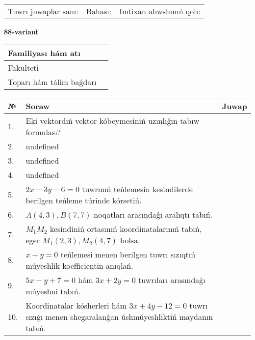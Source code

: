 \documentclass{article}
\begin{document}
\vspace{0.7cm}

\begin{tabular}{lll}
Tuwrı juwaplar sanı: \underline{\hspace{1cm}} & 
Bahası: \underline{\hspace{1cm}} & 
Imtixan alıwshınıń qolı: \underline{\hspace{2cm}} \\
\end{tabular}

\egroup

\newpage


\textbf{88-variant}\\

\bgroup
\def\arraystretch{1.6} %

\begin{tabular}{|m{5.7cm}|m{9.5cm}|}
\hline
Familiyası hám atı & \\
\hline
Fakulteti  & \\
\hline
Toparı hám tálim baǵdarı  & \\
\hline
\end{tabular}

\vspace{0.7cm}

\begin{tabular}{|m{0.7cm}|m{10cm}|m{4cm}|}
\hline
№ & Soraw & Juwap \\
\hline
1. & Eki vektordıń vektor kóbeymesiniń uzınlıǵın tabıw formulası? &  \\
\hline
2. & undefined &  \\
\hline
3. & undefined &  \\
\hline
4. & undefined &  \\
\hline
5. & \(2 x + 3 y - 6 = 0\) tuwrınıń teńlemesin kesindilerde berilgen teńleme túrinde kórsetiń. &  \\
\hline
6. & \(A (4, 3), B (7, 7)\) noqatları arasındaǵı aralıqtı tabıń. &  \\
\hline
7. & \(M_{1}M_{2}\) kesindiniń ortasınıń koordinatalarınıń tabıń, eger \(M_{1} (2, 3), M_{2} (4, 7)\) bolsa. &  \\
\hline
8. & \(x + y = 0\) teńlemesi menen berilgen tuwrı sızıqtıń múyeshlik koefficientin anıqlań. &  \\
\hline
9. & \(5 x - y + 7 = 0\) hám \(3 x + 2 y = 0\) tuwrıları arasındaǵı múyeshni tabıń. &  \\
\hline
10. & Koordinatalar kósherleri hám \( 3 x + 4 y - 12 = 0 \) tuwrı sızıǵı menen shegaralanǵan úshmúyeshliktiń maydanın tabıń. & \\
\hline
\end{tabular}
\end{document}
